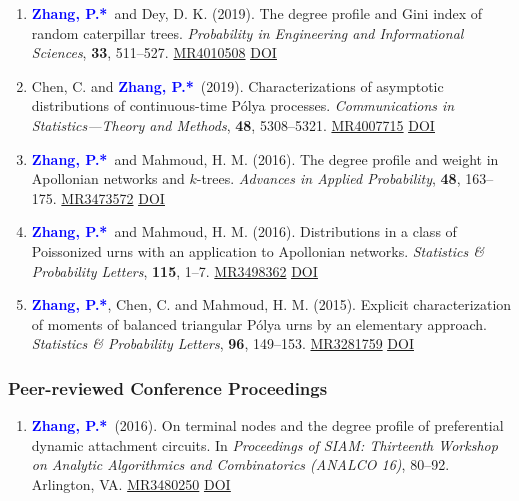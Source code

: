 \documentclass{res}
\def\MR#1{\href{http://www.ams.org/mathscinet-getitem?mr=#1}{MR#1}}
\newcommand{\PZ}{\textbf{\textcolor{blue}{Zhang, P.*}}}
\begin{document}
\begin{resume}
\begin{enumerate}
	\item \PZ\ and {\sc Dey, D. K.} (2019). The degree 
	profile and Gini index of random caterpillar trees. {\em 
	Probability in Engineering and Informational Sciences}, 
	\textbf{33}, 511--527. \MR{4010508}
	\href{https://doi.org/10.1017/S0269964818000475}
	{\underline{DOI}}
		
	\item {\sc Chen, C.} and \PZ\ (2019). Characterizations of 
	asymptotic distributions of continuous-time P\'{o}lya processes. 
	{\em Communications in Statistics---Theory and Methods}, 
	\textbf{48}, 5308--5321. \MR{4007715}
	\href{https://doi.org/10.1080/03610926.2018.1510005}
	{\underline{DOI}}
	
	\item \PZ\ and {\sc Mahmoud, H. M.} (2016). The 
	degree profile and weight in Apollonian networks and $k$-trees. 
	\emph{Advances in Applied Probability}, \textbf{48}, 163--175. 
	\MR{3473572}
	\href{https://doi.org/10.1017/apr.2015.11}
	{\underline{DOI}}
		
	\item \PZ\ and {\sc Mahmoud, H. M.} (2016). 
	Distributions in a class of Poissonized urns with an application 
	to Apollonian networks. \emph{Statistics \& Probability 
	Letters}, {\bf 115}, 1--7. \MR{3498362}
	\href{https://doi.org/10.1016/j.spl.2016.03.023}
	{\underline{DOI}}

	\item \PZ, {\sc Chen, C.} and {\sc Mahmoud, H. M.} 
	(2015). Explicit characterization of moments of balanced 
	triangular P\'{o}lya urns by an elementary approach. 
	\emph{Statistics \& Probability Letters}, {\bf 96}, 149--153. 
	\MR{3281759}
	\href{https://doi.org/10.1016/j.spl.2014.09.016}
	{\underline{DOI}}	
\end{enumerate} 

\subsubsection{Peer-reviewed Conference Proceedings}
\begin{enumerate}
	\item \PZ\ (2016). On terminal nodes and the degree 
	profile of preferential dynamic attachment circuits. In 
	\emph{Proceedings of SIAM: Thirteenth Workshop on Analytic 
	Algorithmics and Combinatorics (ANALCO 16)}, 80--92. Arlington, 
	VA. \MR{3480250}
	\href{https://doi.org/10.1137/1.9781611974324.9}
	{\underline{DOI}}	
\end{enumerate}


\end{resume}
\end{document}
